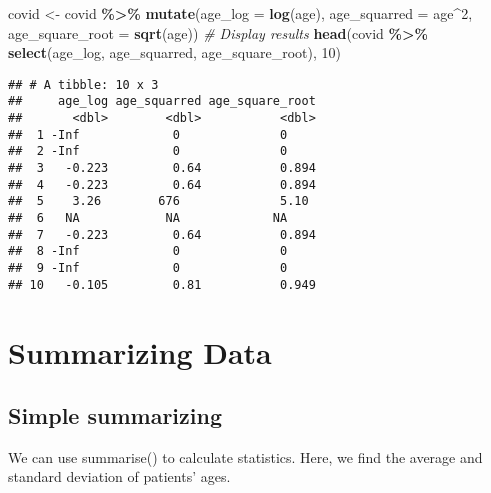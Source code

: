 \documentclass[
]{book}
\newenvironment{Shaded}{\begin{snugshade}}{\end{snugshade}}
\newcommand{\AttributeTok}[1]{\textcolor[rgb]{0.13,0.29,0.53}{#1}}
\newcommand{\CommentTok}[1]{\textcolor[rgb]{0.56,0.35,0.01}{\textit{#1}}}
\newcommand{\DecValTok}[1]{\textcolor[rgb]{0.00,0.00,0.81}{#1}}
\newcommand{\FunctionTok}[1]{\textcolor[rgb]{0.13,0.29,0.53}{\textbf{#1}}}
\newcommand{\NormalTok}[1]{#1}
\newcommand{\OtherTok}[1]{\textcolor[rgb]{0.56,0.35,0.01}{#1}}
\newcommand{\SpecialCharTok}[1]{\textcolor[rgb]{0.81,0.36,0.00}{\textbf{#1}}}
\begin{document}
\begin{Shaded}
\begin{Highlighting}[]
\NormalTok{covid }\OtherTok{\textless{}{-}}\NormalTok{ covid }\SpecialCharTok{\%\textgreater{}\%}
  \FunctionTok{mutate}\NormalTok{(}\AttributeTok{age\_log =} \FunctionTok{log}\NormalTok{(age),}
         \AttributeTok{age\_squarred =}\NormalTok{ age}\SpecialCharTok{\^{}}\DecValTok{2}\NormalTok{,}
         \AttributeTok{age\_square\_root =} \FunctionTok{sqrt}\NormalTok{(age))}
\CommentTok{\# Display results}
\FunctionTok{head}\NormalTok{(covid }\SpecialCharTok{\%\textgreater{}\%} \FunctionTok{select}\NormalTok{(age\_log, age\_squarred, age\_square\_root), }\DecValTok{10}\NormalTok{)}
\end{Highlighting}
\end{Shaded}

\begin{verbatim}
## # A tibble: 10 x 3
##     age_log age_squarred age_square_root
##       <dbl>        <dbl>           <dbl>
##  1 -Inf             0              0    
##  2 -Inf             0              0    
##  3   -0.223         0.64           0.894
##  4   -0.223         0.64           0.894
##  5    3.26        676              5.10 
##  6   NA            NA             NA    
##  7   -0.223         0.64           0.894
##  8 -Inf             0              0    
##  9 -Inf             0              0    
## 10   -0.105         0.81           0.949
\end{verbatim}

\section{Summarizing Data}\label{summarizing-data}

\subsection{Simple summarizing}\label{simple-summarizing}

We can use summarise() to calculate statistics. Here, we find the average and standard deviation of patients' ages.
\end{document}
